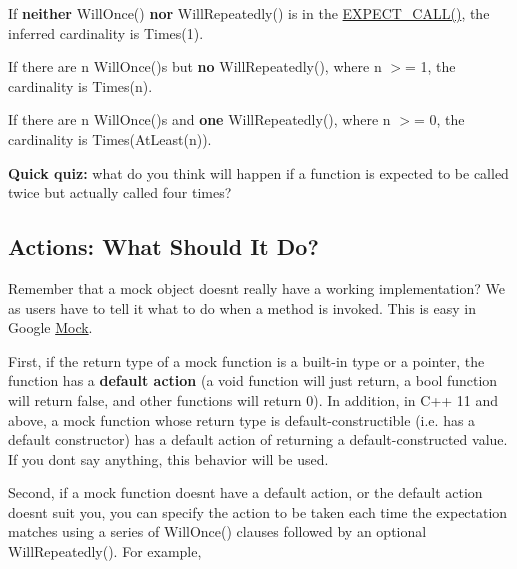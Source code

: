 \begin{DoxyItemize}
\item If {\bfseries{neither}} {\ttfamily Will\+Once()} {\bfseries{nor}} {\ttfamily Will\+Repeatedly()} is in the {\ttfamily \mbox{\hyperlink{gmock-spec-builders_8h_a535a6156de72c1a2e25a127e38ee5232}{E\+X\+P\+E\+C\+T\+\_\+\+C\+A\+L\+L()}}}, the inferred cardinality is {\ttfamily Times(1)}.
\item If there are {\ttfamily n Will\+Once()}\textquotesingle{}s but {\bfseries{no}} {\ttfamily Will\+Repeatedly()}, where {\ttfamily n} $>$= 1, the cardinality is {\ttfamily Times(n)}.
\item If there are {\ttfamily n Will\+Once()}\textquotesingle{}s and {\bfseries{one}} {\ttfamily Will\+Repeatedly()}, where {\ttfamily n} $>$= 0, the cardinality is {\ttfamily Times(\+At\+Least(n))}.
\end{DoxyItemize}

{\bfseries{Quick quiz\+:}} what do you think will happen if a function is expected to be called twice but actually called four times?

\subsection*{Actions\+: What Should It Do?}

Remember that a mock object doesn\textquotesingle{}t really have a working implementation? We as users have to tell it what to do when a method is invoked. This is easy in Google \mbox{\hyperlink{classMock}{Mock}}.

First, if the return type of a mock function is a built-\/in type or a pointer, the function has a {\bfseries{default action}} (a {\ttfamily void} function will just return, a {\ttfamily bool} function will return {\ttfamily false}, and other functions will return 0). In addition, in C++ 11 and above, a mock function whose return type is default-\/constructible (i.\+e. has a default constructor) has a default action of returning a default-\/constructed value. If you don\textquotesingle{}t say anything, this behavior will be used.

Second, if a mock function doesn\textquotesingle{}t have a default action, or the default action doesn\textquotesingle{}t suit you, you can specify the action to be taken each time the expectation matches using a series of {\ttfamily Will\+Once()} clauses followed by an optional {\ttfamily Will\+Repeatedly()}. For example,


\begin{DoxyCode}{0}
\end{DoxyCode}



